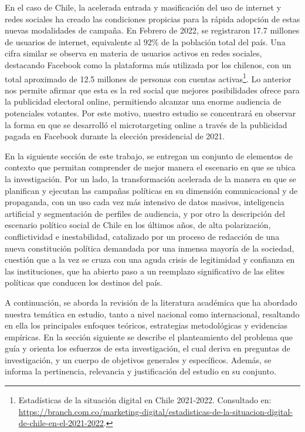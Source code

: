 \documentclass[
  10pt,
  letterpaper,
]{report}
\begin{document}
En el caso de Chile, la acelerada entrada y masificación del uso de
internet y redes sociales ha creado las condiciones propicias para la
rápida adopción de estas nuevas modalidades de campaña. En Febrero de
2022, se registraron 17.7 millones de usuarios de internet, equivalente
al 92\% de la población total del país. Una cifra similar se observa en
materia de usuarios activos en redes sociales, destacando Facebook como
la plataforma más utilizada por los chilenos, con un total aproximado de
12.5 millones de personas con cuentas activas\footnote{Estadísticas de
  la situación digital en Chile 2021-2022. Consultado en:
  \url{https://branch.com.co/marketing-digital/estadisticas-de-la-situacion-digital-de-chile-en-el-2021-2022}.}.
Lo anterior nos permite afirmar que esta es la red social que mejores
posibilidades ofrece para la publicidad electoral online, permitiendo
alcanzar una enorme audiencia de potenciales votantes. Por este motivo,
nuestro estudio se concentrará en observar la forma en que se desarrolló
el microtargeting online a través de la publicidad pagada en Facebook
durante la elección presidencial de 2021.

En la siguiente sección de este trabajo, se entregan un conjunto de
elementos de contexto que permitan comprender de mejor manera el
escenario en que se ubica la investigación. Por un lado, la
transformación acelerada de la manera en que se planifican y ejecutan
las campañas políticas en su dimensión comunicacional y de propaganda,
con un uso cada vez más intensivo de datos masivos, inteligencia
artificial y segmentación de perfiles de audiencia, y por otro la
descripción del escenario político social de Chile en los últimos años,
de alta polarización, conflictividad e inestabilidad, catalizado por un
proceso de redacción de una nueva constitución política demandada por
una inmensa mayoría de la sociedad, cuestión que a la vez se cruza con
una aguda crisis de legitimidad y confianza en las instituciones, que ha
abierto paso a un reemplazo significativo de las elites políticas que
conducen los destinos del país.

A continuación, se aborda la revisión de la literatura académica que ha
abordado nuestra temática en estudio, tanto a nivel nacional como
internacional, resaltando en ella los principales enfoques teóricos,
estrategias metodológicas y evidencias empíricas. En la sección
siguiente se describe el planteamiento del problema que guía y orienta
los esfuerzos de esta investigación, el cual deriva en preguntas de
investigación, y un cuerpo de objetivos generales y específicos. Además,
se informa la pertinencia, relevancia y justificación del estudio en su
conjunto.
\end{document}
